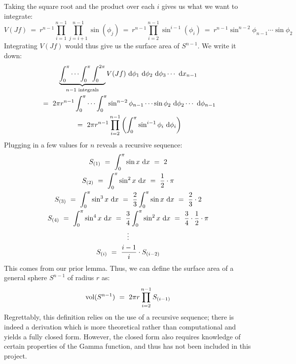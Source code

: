Taking the square root and the product over each $ i $ gives us what we want to
integrate:
\begin{equation*}
    V(Jf) \ = \ r^{n-1}\prod_{i=1}^{n-1}\prod_{j=i+1}^{n-1}\sin(\phi_{j}) \ = \
    r^{n-1}\prod_{i=2}^{n-1}\sin^{i-1}(\phi_{i}) \ = \
    r^{n-1}\sin^{n-2}\phi_{n-1}\cdots\sin\phi_{2}
\end{equation*}
Integrating $ V(Jf) $ would thus give us the surface area of $ S^{n-1} $.
We write it down:
\begin{gather*}
    \underbrace{
    \int_{0}^{\pi}\cdots\int_{0}^{\pi}\int_{0}^{2\pi}}_{n-1 \textrm{ integrals}}
    V(Jf)\textrm{ d}\phi_{1}\textrm{ d}\phi_{2}\textrm{ d}\phi_{3}\cdots\textrm{ d} x_{n-1} \\
    \ = \ 2\pi r^{n-1}\int_{0}^{\pi}\cdots\int_{0}^{\pi}\sin^{n-2}\phi_{n-1}
    \cdots\sin\phi_{2}\textrm{ d}\phi_{2}\cdots\textrm{ d}\phi_{n-1} \\
    \ = \ 2\pi r^{n-1}\prod_{i=2}^{n-1}\left(\int_{0}^{\pi}\sin^{i-1}\phi_{i}
    \textrm{ d}\phi_{i}\right)
\end{gather*}
Plugging in a few values for $ n $ reveals a recursive sequence:
\begin{gather*}
    S_{(1)} \ = \ \int_{0}^{\pi}\sin x\di x \ = \ 2 \\
    S_{(2)} \ = \ \int_{0}^{\pi}\sin^{2} x\di x \ = \ \frac{1}{2}\cdot\pi \\
    S_{(3)} \ = \ \int_{0}^{\pi}\sin^{3} x\di x \ = \ \frac{2}{3}\int_{0}^{\pi}
    \sin x\di x \ = \ \frac{2}{3}\cdot2 \\
    S_{(4)} \ = \ \int_{0}^{\pi}\sin^{4} x\di x \ = \ \frac{3}{4}\int_{0}^{\pi}
    \sin^{2} x\di x \ = \ \frac{3}{4}\cdot\frac{1}{2}\cdot\pi \\
    \vdots \\
    S_{(i)} \ = \ \frac{i-1}{i}\cdot S_{(i-2)}
\end{gather*}
This comes from our prior lemma. Thus, we can define the surface area of a
general sphere $ S^{n-1} $ of radius $ r $ as:
\begin{equation*}
    \operatorname{vol}(S^{n-1}) \ = \ 2\pi r\prod_{i=2}^{n-1}S_{(i-1)}
\end{equation*}
\newpage
Regrettably, this definition relies on the use of a recursive sequence; there is
indeed a derivation which is more theoretical rather than computational and
yields a fully closed form. However, the closed form also requires knowledge of
certain properties of the Gamma function, and thus has not been included in this
project.

